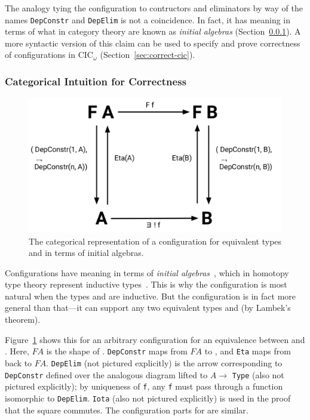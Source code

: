 The analogy tying the configuration to contructors and eliminators by way of the names \lstinline{DepConstr} and \lstinline{DepElim} is not a coincidence.
In fact, it has meaning in terms of what in category theory are known as \textit{initial algebras} (Section~\ref{sec:algebra}).
A more syntactic version of this claim can be used to specify and prove correctness of configurations in CIC$_{\omega}$ (Section~\ref{sec:correct-cic}).

\subsubsection{Categorical Intuition for Correctness}
\label{sec:algebra}

\begin{figure}
\begin{center}
\includegraphics[scale=0.40]{often/Diagram}
\end{center}
\caption{The categorical representation of a configuration for equivalent types \Aa and \B in terms of initial algebras.}
\label{fig:lambek}
\end{figure}

Configurations have meaning in terms of \textit{initial algebras}~\cite{nlab:initial_algebra_of_an_endofunctor},
which in homotopy type theory represent inductive types~\cite{univalent2013homotopy}.
This is why the configuration is most natural when the types \Aa and \B are inductive.
But the configuration is in fact more general than that---it can support any two equivalent types \Aa and \B (by Lambek's theorem).

Figure~\ref{fig:lambek} shows this for an arbitrary configuration for an equivalence between \Aa and \B.
Here, $F A$ is the shape of \Aa.
\lstinline{DepConstr} maps from $F A$ to \Aa, and \lstinline{Eta} maps from \Aa back to $F A$.
\lstinline{DepElim} (not pictured explicitly) is the arrow corresponding to \lstinline{DepConstr} defined over the analogous diagram
lifted to $A \rightarrow$ \lstinline{Type} (also not pictured explicitly);
by uniqueness of \lstinline{f}, any \lstinline{f} must pass through a function 
isomorphic to \lstinline{DepElim}.
\lstinline{Iota} (also not pictured explicitly) is used in the proof that the square commutes.
The configuration parts for \B are similar.

